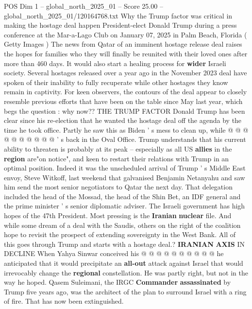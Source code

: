 \begin{textsample}{POS Dim 1 – global\_north\_2025\_01 – Score 25.00 – global\_north\_2025\_01/120164768.txt}  \label{ex:f1_pos_391}
Why the Trump factor was critical in making the hostage deal happen President-elect Donald Trump during a press conference at the Mar-a-Lago Club on January 07, 2025 in Palm Beach, Florida ( Getty Images ) The news from Qatar of an imminent hostage release deal raises the hopes for families who they will finally be reunited with their loved ones after more than 460 days.
It would also start a healing process for \textbf{wider} Israeli society.
Several hostages released over a year ago in the November 2023 deal have spoken of their inability to fully recuperate while other hostages they know remain in captivity.
For keen observers, the contours of the deal appear to closely resemble previous efforts that have been on the table since May last year, which begs the question : why now??
THE TRUMP FACTOR Donald Trump has been clear since his re-election that he wanted the hostage deal off the agenda by the time he took office.
Partly he saw this as Biden ' s mess to clean up, while @ @ @ @ @ @ @ @ @ @ ' s back in the Oval Office.
Trump understands that his current ability to threaten is probably at its peak -- especially as all US \textbf{allies} in the \textbf{region} are"on notice", and keen to restart their relations with Trump in an optimal position.
Indeed it was the unscheduled arrival of Trump ' s Middle East envoy, Steve Witkoff, last weekend that galvanised Benjamin Netanyahu and saw him send the most senior negotiators to Qatar the next day.
That delegation included the head of the Mossad, the head of the Shin Bet, an IDF general and the prime minister ' s senior diplomatic adviser.
The Israeli government has high hopes of the 47th President.
Most pressing is the \textbf{Iranian} \textbf{nuclear} file.
And while some dream of a deal with the Saudis, others on the right of the coalition hope to revisit the prospect of extending sovereignty in the West Bank.
All of this goes through Trump and starts with a hostage deal.? \textbf{IRANIAN} \textbf{AXIS} IN DECLINE When Yahya Sinwar conceived his @ @ @ @ @ @ @ @ @ @ he anticipated that it would precipitate an \textbf{all-out} attack against Israel that would irrevocably change the \textbf{regional} constellation.
He was partly right, but not in the way he hoped.
Qasem Suleimani, the IRGC \textbf{Commander} \textbf{assassinated} by Trump five years ago, was the architect of the plan to surround Israel with a ring of fire.
That has now been extinguished.

\end{textsample}
